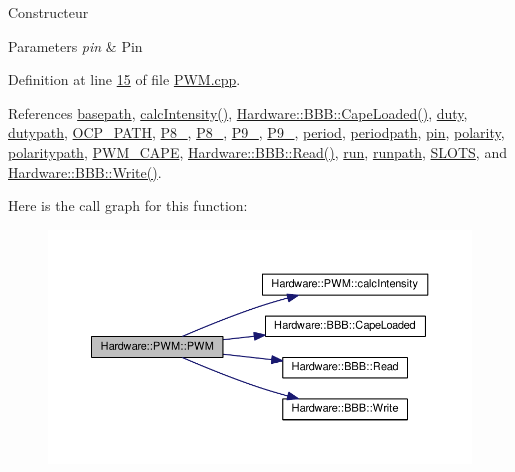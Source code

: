 Constructeur 


\begin{DoxyParams}{Parameters}
{\em pin} & Pin\\
\hline
\end{DoxyParams}


Definition at line \hyperlink{_p_w_m_8cpp_source_l00015}{15} of file \hyperlink{_p_w_m_8cpp_source}{P\+W\+M.\+cpp}.



References \hyperlink{_p_w_m_8h_source_l00062}{basepath}, \hyperlink{_p_w_m_8cpp_source_l00070}{calc\+Intensity()}, \hyperlink{_b_b_b_8cpp_source_l00067}{Hardware\+::\+B\+B\+B\+::\+Cape\+Loaded()}, \hyperlink{_p_w_m_8h_source_l00056}{duty}, \hyperlink{_p_w_m_8h_source_l00063}{dutypath}, \hyperlink{_p_w_m_8h_source_l00012}{O\+C\+P\+\_\+\+P\+A\+T\+H}, \hyperlink{_p_w_m_8h_source_l00019}{P8\+\_}, \hyperlink{_p_w_m_8h_source_l00020}{P8\+\_}, \hyperlink{_p_w_m_8h_source_l00021}{P9\+\_}, \hyperlink{_p_w_m_8h_source_l00022}{P9\+\_}, \hyperlink{_p_w_m_8h_source_l00055}{period}, \hyperlink{_p_w_m_8h_source_l00064}{periodpath}, \hyperlink{_p_w_m_8h_source_l00030}{pin}, \hyperlink{_p_w_m_8h_source_l00060}{polarity}, \hyperlink{_p_w_m_8h_source_l00066}{polaritypath}, \hyperlink{_p_w_m_8h_source_l00013}{P\+W\+M\+\_\+\+C\+A\+P\+E}, \hyperlink{_b_b_b_8cpp_source_l00026}{Hardware\+::\+B\+B\+B\+::\+Read()}, \hyperlink{_p_w_m_8h_source_l00059}{run}, \hyperlink{_p_w_m_8h_source_l00065}{runpath}, \hyperlink{_b_b_b_8h_source_l00016}{S\+L\+O\+T\+S}, and \hyperlink{_b_b_b_8cpp_source_l00042}{Hardware\+::\+B\+B\+B\+::\+Write()}.



Here is the call graph for this function\+:
\nopagebreak
\begin{figure}[H]
\begin{center}
\leavevmode
\includegraphics[width=350pt]{class_hardware_1_1_p_w_m_ac5608137ddc798aa26c505ec6edb8458_cgraph}
\end{center}
\end{figure}


